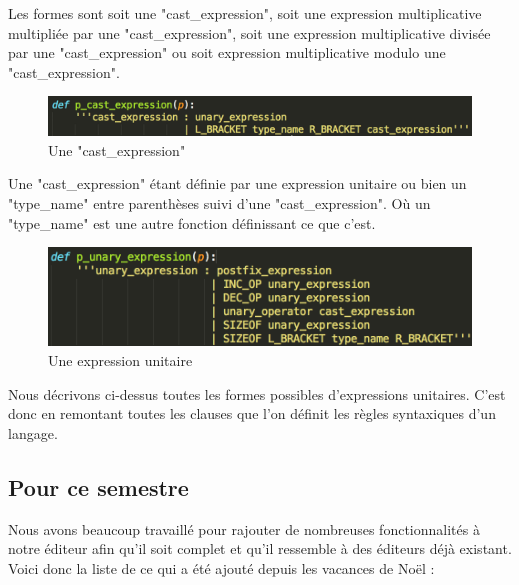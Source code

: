 \documentclass[a4paper,12pt]{article}
\begin{document}
		Les formes sont soit une "cast\_expression", soit une expression multiplicative multipliée par une "cast\_expression", soit une expression multiplicative divisée par une "cast\_expression" ou soit expression multiplicative modulo une "cast\_expression".
		
		\begin{figure}[!h]
			\begin{center}
				\includegraphics[scale=0.7]{images/yacc2}
				\caption{Une "cast\_expression"}
			\end{center}
		\end{figure}
		
		Une "cast\_expression" étant définie par une expression unitaire ou bien un "type\_name" entre parenthèses suivi d'une "cast\_expression". Où un "type\_name" est une autre fonction définissant ce que c'est.
		
		\begin{figure}[!h]
			\begin{center}
				\includegraphics[scale=0.7]{images/yacc3}
				\caption{Une expression unitaire}
			\end{center}
		\end{figure}
		
		Nous décrivons ci-dessus toutes les formes possibles d'expressions unitaires. C'est donc en remontant toutes les clauses que l'on définit les règles syntaxiques d'un langage.
		
	\subsection{Pour ce semestre}
	
		Nous avons beaucoup travaillé pour rajouter de nombreuses fonctionnalités à notre éditeur afin qu'il soit complet et qu'il ressemble à des éditeurs déjà existant.\\
		
		Voici donc la liste de ce qui a été ajouté depuis les vacances de Noël :
		
\end{document}
